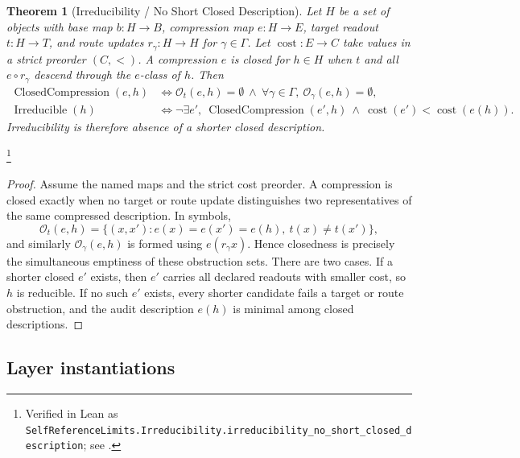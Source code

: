 \documentclass[11pt]{article}
\newtheorem{theorem}{Theorem}[section]
\theoremstyle{definition}
\begin{document}
\begin{theorem}[Irreducibility / No Short Closed Description]\label{thm:F42}
Let \(H\) be a set of objects with base map \(b:H\to B\), compression
map \(e:H\to E\), target readout \(t:H\to T\), and route updates
\(r_\gamma:H\to H\) for \(\gamma\in\Gamma\). Let
\(\operatorname{cost}:E\to C\) take values in a strict preorder
\((C,<)\). A compression \(e\) is closed for \(h\in H\) when \(t\) and
all \(e\circ r_\gamma\) descend through the \(e\)-class of \(h\). Then
\begin{align*}
  \operatorname{ClosedCompression}(e,h)
  &\iff
  \mathcal O_t(e,h)=\emptyset
  \ \wedge\
  \forall\gamma\in\Gamma,\ \mathcal O_\gamma(e,h)=\emptyset,\\
  \operatorname{Irreducible}(h)
  &\iff
  \neg\exists e'\!,\
  \operatorname{ClosedCompression}(e',h)
  \ \wedge\
  \operatorname{cost}(e')<\operatorname{cost}(e(h)).
\end{align*}
Irreducibility is therefore absence of a shorter closed description.
\end{theorem}
\footnote{\raggedright Verified in Lean as
\texttt{SelfReferenceLimits.\allowbreak{}Irreducibility.\allowbreak{}irreducibility\_no\_short\_closed\_description};
see .}
\begin{proof}
Assume the named maps and the strict cost preorder. A compression is
closed exactly when no target or route update distinguishes two
representatives of the same compressed description. In symbols,
\[
  \mathcal O_t(e,h)=
  \{(x,x'):e(x)=e(x')=e(h),\ t(x)\ne t(x')\},
\]
and similarly \(\mathcal O_\gamma(e,h)\) is formed using
\(e(r_\gamma x)\). Hence closedness is precisely the simultaneous
emptiness of these obstruction sets. There are two cases. If a shorter
closed \(e'\) exists, then \(e'\) carries all declared readouts with
smaller cost, so \(h\) is reducible. If no such \(e'\) exists, every
shorter candidate fails a target or route obstruction, and the audit
description \(e(h)\) is minimal among closed descriptions.
\end{proof}

\subsection*{Layer instantiations}\label{layer-inst:F42}
\end{document}
